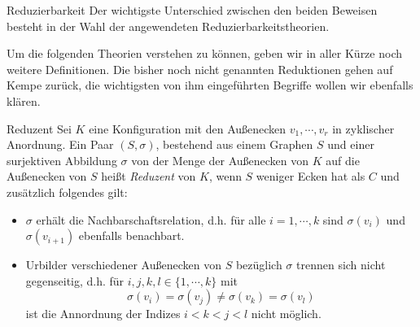\begin{section}{Reduzierbarkeit}
 \label{sec:AHRed}
 Der wichtigste Unterschied zwischen den beiden Beweisen besteht in der Wahl der angewendeten Reduzierbarkeitstheorien. 
 
 Um die folgenden Theorien verstehen zu können, geben wir in aller Kürze noch weitere Definitionen. Die bisher noch nicht genannten Reduktionen gehen auf Kempe zurück, die wichtigsten von ihm eingeführten Begriffe wollen wir ebenfalls klären.
 
 \begin{definition}{Reduzent}
  Sei $K$ eine Konfiguration mit den Außenecken $v_1,\cdots,v_r$ in zyklischer Anordnung. Ein Paar $(S,\sigma)$, bestehend aus einem Graphen $S$ und einer surjektiven Abbildung $\sigma$ von der Menge der Außenecken von $K$ auf die Außenecken von $S$ heißt \textit{Reduzent} von $K$, wenn $S$ weniger Ecken hat als $C$ und zusätzlich folgendes gilt:
  \begin{itemize}
   \item $\sigma$ erhält die Nachbarschaftsrelation, d.h. für alle $i = 1,\cdots,k$ sind $\sigma(v_i)$ und $\sigma(v_{i+1})$ ebenfalls benachbart.
   \item Urbilder verschiedener Außenecken von $S$ bezüglich $\sigma$ trennen sich nicht gegenseitig, d.h. für $i,j,k,l \in \{1,\cdots,k\}$ mit
   \[ \sigma(v_i) = \sigma(v_j) \neq \sigma(v_k) = \sigma(v_l)\]
   ist die Annordnung der Indizes $i < k < j < l$ nicht möglich.
  \end{itemize}
 \end{definition}
 

\end{section}
